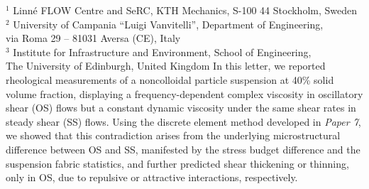 %
%
%
%
%
%
%
\paperaffiliation
{%
  $^1$ Linn\'e FLOW Centre and SeRC, KTH Mechanics, S-100 44 Stockholm, Sweden\\%
  $^2$ University of Campania ``Luigi Vanvitelli'', Department of Engineering, \\via Roma 29 -- 81031 Aversa (CE), Italy\\%
  $^3$ Institute for Infrastructure and Environment, School of Engineering, \\The University of Edinburgh, United Kingdom%
}%
%
%
%
\papervolume{}%
%
\papernumber{}
%
\paperpages{}%
%
\paperyear{}%
%
\papersummary%
{%
   In this letter, we reported rheological measurements of a noncolloidal particle suspension at 40\% solid volume fraction, displaying a frequency-dependent complex viscosity in oscillatory shear (OS) flows but a constant dynamic viscosity under the same shear rates in steady shear (SS) flows. Using the discrete element method developed in \emph{Paper 7}, we showed that this contradiction arises from the underlying microstructural difference between OS and SS, manifested by the stress budget difference and the suspension fabric statistics, and further predicted shear thickening or thinning, only in OS, due to repulsive or attractive interactions, respectively.
}%
%
\graphicspath{{paper8/}}%
%
%
